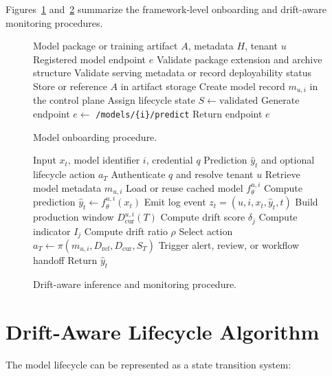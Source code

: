 \documentclass[runningheads]{llncs}
\begin{document}
Figures~\ref{alg:onboarding} and~\ref{alg:monitoring} summarize the framework-level onboarding and drift-aware monitoring procedures.

\begin{figure}[t]
\small
\begin{algorithmic}[1]
\REQUIRE Model package or training artifact $A$, metadata $H$, tenant $u$
\ENSURE Registered model endpoint $e$
\STATE Validate package extension and archive structure
\STATE Validate serving metadata or record deployability status
\STATE Store or reference $A$ in artifact storage
\STATE Create model record $m_{u,i}$ in the control plane
\STATE Assign lifecycle state $S \leftarrow \mathrm{validated}$
\STATE Generate endpoint $e \leftarrow$ \texttt{/models/\{i\}/predict}
\STATE Return endpoint $e$
\end{algorithmic}
\caption{Model onboarding procedure.}
\label{alg:onboarding}
\end{figure}

\begin{figure}[t]
\small
\begin{algorithmic}[1]
\REQUIRE Input $x_t$, model identifier $i$, credential $q$
\ENSURE Prediction $\hat{y}_t$ and optional lifecycle action $a_T$
\STATE Authenticate $q$ and resolve tenant $u$
\STATE Retrieve model metadata $m_{u,i}$
\STATE Load or reuse cached model $f_{\theta}^{u,i}$
\STATE Compute prediction $\hat{y}_t \leftarrow f_{\theta}^{u,i}(x_t)$
\STATE Emit log event $z_t=(u,i,x_t,\hat{y}_t,t)$
    \STATE Build production window $D_{\mathrm{cur}}^{u,i}(T)$
        \STATE Compute drift score $\delta_j$
        \STATE Compute indicator $I_j$
    \ENDFOR
    \STATE Compute drift ratio $\rho$
    \STATE Select action $a_T \leftarrow \pi(m_{u,i},D_{\mathrm{ref}},D_{\mathrm{cur}},S_T)$
        \STATE Trigger alert, review, or workflow handoff
    \ENDIF
\ENDIF
\STATE Return $\hat{y}_t$
\end{algorithmic}
\caption{Drift-aware inference and monitoring procedure.}
\label{alg:monitoring}
\end{figure}

\section{Drift-Aware Lifecycle Algorithm}

The model lifecycle can be represented as a state transition system:
\end{document}
